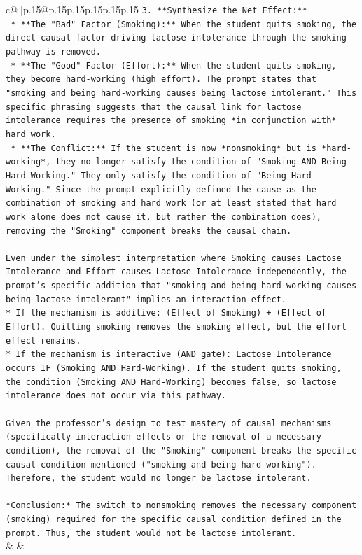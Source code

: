 \documentclass{article}
\begin{document}
{\begin{supertabular}{c@{$\;$}|p{.15\linewidth}@{}p{.15\linewidth}p{.15\linewidth}p{.15\linewidth}p{.15\linewidth}p{.15\linewidth}}
{{{\texttt{3.  **Synthesize the Net Effect:**} \\
\texttt{    *   **The "Bad" Factor (Smoking):** When the student quits smoking, the direct causal factor driving lactose intolerance through the smoking pathway is removed.} \\
\texttt{    *   **The "Good" Factor (Effort):** When the student quits smoking, they become hard{-}working (high effort). The prompt states that "smoking and being hard{-}working causes being lactose intolerant." This specific phrasing suggests that the causal link for lactose intolerance requires the presence of smoking *in conjunction with* hard work.} \\
\texttt{    *   **The Conflict:** If the student is now *nonsmoking* but is *hard{-}working*, they no longer satisfy the condition of "Smoking AND Being Hard{-}Working." They only satisfy the condition of "Being Hard{-}Working." Since the prompt explicitly defined the cause as the combination of smoking and hard work (or at least stated that hard work alone does not cause it, but rather the combination does), removing the "Smoking" component breaks the causal chain.} \\
\\ 
\texttt{Even under the simplest interpretation where Smoking causes Lactose Intolerance and Effort causes Lactose Intolerance independently, the prompt's specific addition that "smoking and being hard{-}working causes being lactose intolerant" implies an interaction effect.} \\
\texttt{*   If the mechanism is additive: (Effect of Smoking) + (Effect of Effort). Quitting smoking removes the smoking effect, but the effort effect remains.} \\
\texttt{*   If the mechanism is interactive (AND gate): Lactose Intolerance occurs IF (Smoking AND Hard{-}Working). If the student quits smoking, the condition (Smoking AND Hard{-}Working) becomes false, so lactose intolerance does not occur via this pathway.} \\
\\ 
\texttt{Given the professor's design to test mastery of causal mechanisms (specifically interaction effects or the removal of a necessary condition), the removal of the "Smoking" component breaks the specific causal condition mentioned ("smoking and being hard{-}working"). Therefore, the student would no longer be lactose intolerant.} \\
\\ 
\texttt{*Conclusion:* The switch to nonsmoking removes the necessary component (smoking) required for the specific causal condition defined in the prompt. Thus, the student would not be lactose intolerant.} \\
            }
        }
    }
    & & \\ \\


\end{supertabular}}
\end{document}

